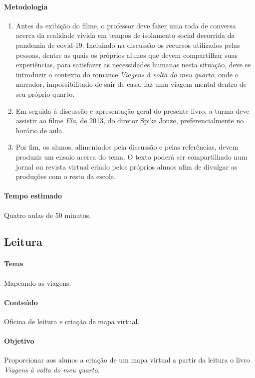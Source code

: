 \documentclass[12pt]{extarticle}
\begin{document}
\paragraph{Metodologia}
\begin{enumerate}
	\item
	Antes da exibição do filme, o professor deve fazer uma roda de conversa acerca 
	da realidade vivida em tempos de isolamento social decorrida da pandemia 
	de covid-19. Incluindo na discussão os recursos utilizados pelas
	pessoas, dentre as quais os próprios alunos que devem compartilhar suas
	experiências, para satisfazer as necessidades humanas nesta situação, 
	deve se introduzir o contexto do romance \emph{Viagens à volta do meu quarto},
	onde o narrador, impossibilitado de sair de casa, faz uma viagem 
	mental dentro de seu próprio quarto. 
	\item
	Em seguida à discussão e apresentação geral do presente livro, a turma deve assistir 
	ao filme \emph{Ela}, de 2013, do diretor Spike Jonze, preferencialmente no horário de aula. 
	\item
	Por fim, os alunos, alimentados pela discussão e pelas referências, devem produzir 
	um ensaio acerca do tema. O texto poderá ser compartilhado num jornal ou revista
	virtual criado pelos próprios alunos afim de divulgar as produções 
	com o resto da escola.
\end{enumerate}

\paragraph{Tempo estimado} Quatro aulas de 50 minutos.


\subsection{Leitura}

\paragraph{Tema} Mapeando as viagens.

\paragraph{Conteúdo} Oficina de leitura e criação de mapa virtual.

\paragraph{Objetivo} Proporcionar aos alunos a criação de um mapa virtual
a partir da leitura o livro \emph{Viagens à volta do meu quarto}.
\end{document}
